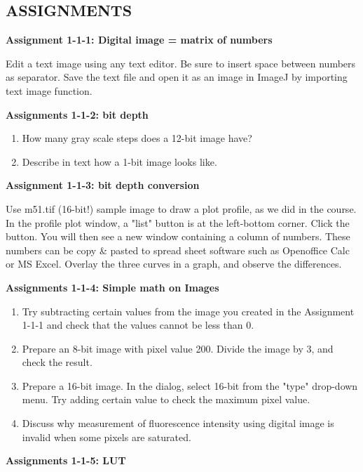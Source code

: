 \clearpage
\subsection{ASSIGNMENTS }%

\textbf{\sffamily
Assignment 1-1-1: Digital image = matrix of numbers}

Edit a text image using any text editor. Be sure to insert space between
numbers as separator. Save the text file and open it as an image in
ImageJ by importing text image function. \ \ 

\textbf{\sffamily
Assignments 1-1-2: bit depth}
\begin{enumerate}
\item How many gray scale steps does a 12-bit image have?\\
\item Describe in text how a 1-bit image looks like.
\end{enumerate}

\textbf{\sffamily
Assignment 1-1-3: bit depth conversion}

Use m51.tif (16-bit!) sample image to draw a plot profile, as we did in
the course. In the profile plot window, a
"list" button is at the left-bottom corner.
Click the button. You will then see a new window containing a column of
numbers. These numbers can be copy \& pasted to spread sheet software
such as Openoffice Calc or MS Excel. Overlay the three curves in a graph,
and observe the differences. 

\textbf{\sffamily
Assignments 1-1-4: Simple math on Images}
\begin{enumerate}
\item Try subtracting certain values from the image you created in
the Assignment 1-1-1 and check that the values cannot be less than 0. 
\item Prepare an 8-bit image with pixel value 200. Divide the
image by 3, and check the result. 

\item Prepare a 16-bit image. In the  dialog, select 16-bit from the
"type" drop-down menu. Try adding
certain value to check the maximum pixel value. 

\item Discuss why measurement of fluorescence intensity using
digital image is invalid when some pixels are saturated. 
\end{enumerate}

\textbf{\sffamily
Assignments 1-1-5: LUT}

